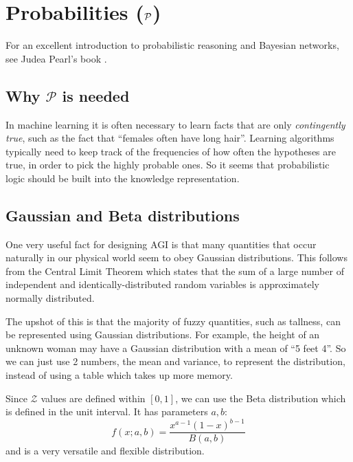 \chapter{Probabilities ($\mathcal{P}$)}
\label{ch:probabilities}
\minitoc

For an excellent introduction to probabilistic reasoning and Bayesian networks, see Judea Pearl's book \citep*{Pearl1988}.

\section{Why $\mathcal{P}$ is needed}
\label{sec:whyP}

In machine learning it is often necessary to learn facts that are only \textit{contingently true}, such as the fact that ``females often have long hair''.  Learning algorithms typically need to keep track of the frequencies of how often the hypotheses are true, in order to pick the highly probable ones.  So it seems that probabilistic logic should be built into the knowledge representation.

\section{Gaussian and Beta distributions}

One very useful fact for designing AGI is that many quantities that occur naturally in our physical world seem to obey Gaussian distributions.  This follows from the Central Limit Theorem which states that the sum of a large number of independent and identically-distributed random variables is approximately normally distributed.

The upshot of this is that the majority of fuzzy quantities, such as tallness, can be represented using Gaussian distributions.  For example, the height of an unknown woman may have a Gaussian distribution with a mean of ``5 feet 4''.  So we can just use 2 numbers, the mean and variance, to represent the distribution, instead of using a table which takes up more memory.

Since $\mathcal{Z}$ values are defined within $[0,1]$, we can use the Beta distribution which is defined in the unit interval.  It has parameters $a, b$:
\begin{equation}
f(x; a, b) = \frac{x^{a - 1} (1 - x)^{b - 1} }{B(a,b)}
\label{eqn:beta-distro}
\end{equation}
and is a very versatile and flexible distribution.

